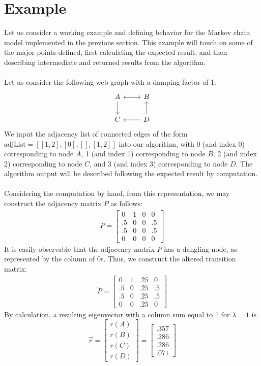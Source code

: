 \documentclass{article}
\begin{document}
\section{Example}
    Let us consider a working example and defining behavior for the Markov chain model implemented in the previous section. This example will touch on some of the major points defined, first calculating the expected result, and then describing intermediate and returned results from the algorithm.
    \\\\
    \noindent
    Let us consider the following web graph with a damping factor of 1: 
    $$
    \begin{tikzcd}
        A \arrow[r] \arrow[d]
        & B \arrow[l] \\
        C 
        & D \arrow[l] \arrow[u]
    \end{tikzcd}
    $$
    \noindent
    We input the adjacency list of connected edges of the form $\text{adjList} = [[1, 2],[0],[],[1, 2]]$ into our algorithm, with 0 (and index 0) corresponding to node $A$, 1 (and index 1) corresponding to node $B$, 2 (and index 2) corresponding to node $C$, and 3 (and index 3) corresponding to node $D$. The algorithm output will be described following the expected result by computation.
    \\\\
    \noindent
    Considering the computation by hand, from this representation, we may construct the adjacency matrix $P$ as follows:
    \begin{align*}
        P = \begin{bmatrix} 0 & 1 & 0 & 0 \\ .5 & 0 & 0 & .5 \\ .5 & 0 & 0 & .5 \\  0 & 0 & 0 & 0\end{bmatrix}
    \end{align*}
    It is easily observable that the adjacency matrix $P$ has a dangling node, as represented by the column of 0s. Thus, we construct the altered transition matrix:
    \begin{align*}
        \widetilde{P} = \begin{bmatrix} 0 & 1 & .25 & 0 \\ .5 & 0 & .25 & .5 \\ .5 & 0 & .25 & .5 \\  0 & 0 & .25 & 0\end{bmatrix}
    \end{align*}
    By calculation, a resulting eigenvector with a column sum equal to 1 for $\lambda = 1$ is $$\vec{r} = \begin{bmatrix} r(A) \\ r(B) \\ r(C) \\ r(D) \end{bmatrix} = \begin{bmatrix} .357 \\ .286 \\ .286 \\.071 \end{bmatrix}$$
\end{document}
